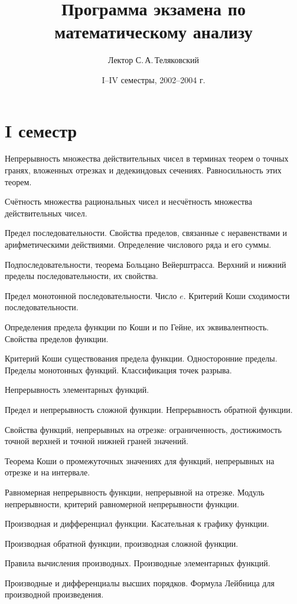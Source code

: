 \documentclass[a4paper]{article}
\title{Программа экзамена по математическому анализу}
\author{Лектор С.\,А.\,Теляковский}
\date{I--IV семестры, 2002--2004 г.}
\begin{document}
\maketitle

\section*{I семестр}
\begin{nums}{-3}
\item Непрерывность множества действительных чисел в терминах теорем
      о точных гранях, вложенных отрезках и дедекиндовых сечениях. Равносильность
      этих теорем.
\item Счётность множества рациональных чисел и несчётность множества действительных чисел.
\item Предел последовательности. Свойства пределов, связанные с неравенствами
      и арифметическими действиями. Определение числового ряда и его суммы.
\item Подпоследовательности, теорема Больцано Вейерштрасса. Верхний и нижний пределы последовательности,
их свойства.
\item Предел монотонной последовательности. Число $e$. Критерий Коши сходимости последовательности.
\item Определения предела функции по Коши и по Гейне, их эквивалентность. Свойства пределов функции.
\item Критерий Коши существования предела функции. Односторонние пределы. Пределы монотонных функций.
 Классификация точек разрыва.
\item Непрерывность элементарных функций.
\item Предел и непрерывность сложной функции. Непрерывность обратной функции.
\item Свойства функций, непрерывных на отрезке: ограниченность, достижимость точной верхней и точной
нижней граней значений.
\item Теорема Коши о промежуточных значениях для функций, непрерывных на отрезке и на интервале.
\item Равномерная непрерывность функции, непрерывной на отрезке. Модуль непрерывности, критерий равномерной
непрерывности функции.
\item Производная и дифференциал функции. Касательная к графику функции.
\item Производная обратной функции, производная сложной функции.
\item Правила вычисления производных. Производные элементарных функций.
\item Производные и дифференциалы высших порядков. Формула Лейбница для производной произведения.

\end{nums}
\end{document}
